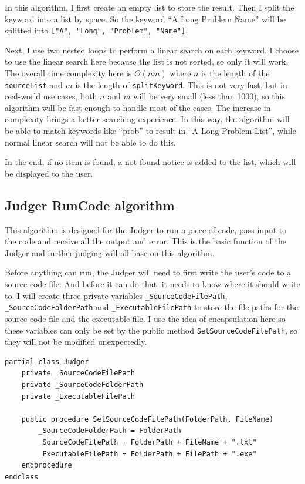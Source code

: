 \documentclass[a4paper]{report}
\begin{document}
In this algorithm, I first create an empty list to store the result. Then I split the keyword into a list by space. So the keyword ``A Long Problem Name'' will be splitted into \verb|["A", "Long", "Problem", "Name"]|.

Next, I use two nested loops to perform a linear search on each keyword. I choose to use the linear search here because the list is not sorted, so only it will work. The overall time complexity here is $O(nm)$ where $n$ is the length of the \verb|sourceList| and $m$ is the length of \verb|splitKeyword|. This is not very fast, but in real-world use cases, both $n$ and $m$ will be very small (less than 1000), so this algorithm will be fast enough to handle most of the cases. The increase in complexity brings a better searching experience. In this way, the algorithm will be able to match keywords like ``prob'' to result in ``A Long Problem List'', while normal linear search will not be able to do this.

In the end, if no item is found, a not found notice is added to the list, which will be displayed to the user.

\subsection{Judger RunCode algorithm}

This algorithm is designed for the Judger to run a piece of code, pass input to the code and receive all the output and error. This is the basic function of the Judger and further judging will all base on this algorithm.

Before anything can run, the Judger will need to first write the user's code to a source code file. And before it can do that, it needs to know where it should write to. I will create three private variables \verb|_SourceCodeFilePath|, \verb|_SourceCodeFolderPath| and \verb|_ExecutableFilePath| to store the file paths for the source code file and the executable file. I use the idea of encapsulation here so these variables can only be set by the public method \verb|SetSourceCodeFilePath|, so they will not be modified unexpectedly.

\begin{verbatim}
partial class Judger
    private _SourceCodeFilePath
    private _SourceCodeFolderPath
    private _ExecutableFilePath

    public procedure SetSourceCodeFilePath(FolderPath, FileName)
        _SourceCodeFolderPath = FolderPath
        _SourceCodeFilePath = FolderPath + FileName + ".txt"
        _ExecutableFilePath = FolderPath + FilePath + ".exe"
    endprocedure
endclass
\end{verbatim}
\end{document}
